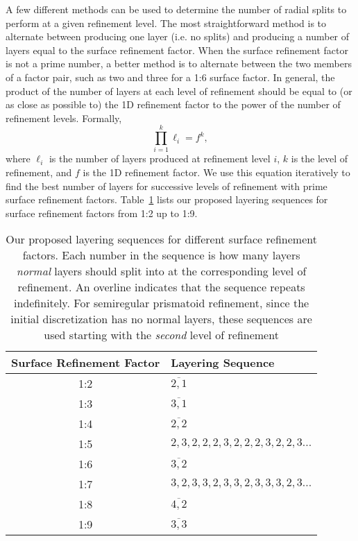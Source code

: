 A few different methods can be used to determine the number of radial splits to perform at a given refinement level.
The most straightforward method is to alternate between producing one layer (i.e.
no splits) and producing a number of layers equal to the surface refinement factor.
When the surface refinement factor is not a prime number, a better method is to alternate between the two members of a factor pair, such as two and three for a 1:6 surface factor.
In general, the product of the number of layers at each level of refinement should be equal to (or as close as possible to) the 1D refinement factor to the power of the number of refinement levels.
Formally,
%
\begin{equation*}
\prod_{i = 1}^{k} \ell_{i} = f^{k},
\end{equation*}
%
where $\ell_{i}$ is the number of layers produced at refinement level $i$, $k$ is the level of refinement, and $f$ is the 1D refinement factor.
We use this equation iteratively to find the best number of layers for successive levels of refinement with prime surface refinement factors.
Table~\ref{tab:layers} lists our proposed layering sequences for surface refinement factors from 1:2 up to 1:9.


\begin{table}[ht!]
	\centering
	\caption[Layering sequences for different surface refinement factors]{
		Our proposed layering sequences for different surface refinement factors.
		Each number in the sequence is how many layers \textit{normal} layers should split into at the corresponding level of refinement.
		An overline indicates that the sequence repeats indefinitely.
		For semiregular prismatoid refinement, since the initial discretization has no normal layers, these sequences are used starting with the \textit{second} level of refinement
	}
	\begin{tabular}{@{} c l @{}}
		\toprule
		Surface Refinement Factor & Layering Sequence         \\ \midrule
		1:2                  & $\overline{2,1}$               \\
		1:3                  & $\overline{3,1}$               \\
		1:4                  & $\overline{2,2}$               \\
		1:5                  & $2,3,2,2,2,3,2,2,2,3,2,2,3...$ \\
		1:6                  & $\overline{3,2}$               \\
		1:7                  & $3,2,3,3,2,3,3,2,3,3,3,2,3...$ \\
		1:8                  & $\overline{4,2}$               \\
		1:9                  & $\overline{3,3}$               \\ \bottomrule
	\end{tabular}
	\label{tab:layers}
\end{table}


